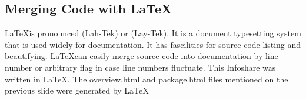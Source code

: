\documentclass[12pt,notitlepage]{article}
\begin{document}
\begin{s5presentation}
\begin{ifhtml}
\begin{s5slide}
      \section{Merging Code with \LaTeX}
      \LaTeX is pronounced (Lah-Tek) or (Lay-Tek). It is a document typesetting system that is used 
      widely for documentation. It has fascilities for source code listing and beautifying. \LaTeX can
      easily merge source code into documentation by line number or arbitrary flag in case line numbers
      fluctuate.
      This Infoshare was written in \LaTeX. The overview.html and package.html files mentioned on the 
      previous slide were generated by \LaTeX
      \begin{slideshow}
        \item {}
        \item {}
      \end{slideshow}
    \end{s5slide}
    \begin{s5slide}
      \begin{slideshow}
        \item {}
        \item {}
      \end{slideshow}
    \end{s5slide}
  \end{ifhtml}
  \W \end{s5presentation}
\end{document}
